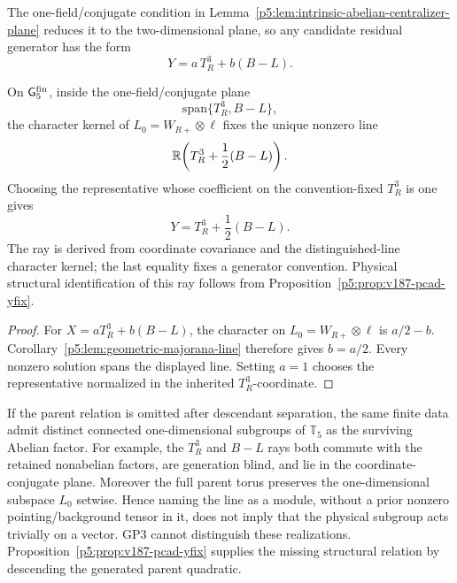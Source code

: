 \documentclass[11pt,a4paper]{article}
\begin{document}
The one-field/conjugate condition in
Lemma~\ref{p5:lem:intrinsic-abelian-centralizer-plane} reduces it to the
two-dimensional plane, so any candidate residual generator has the form
\begin{equation}
\label{p5:eq:part1-Y-general}
Y=a\,T_R^3+b(B-L).
\end{equation}

\begin{lemma}
\label{p5:lem:hypercharge-normalization-unique}
On \(\mathsf G_5^{\rm fin}\), inside the
one-field/conjugate plane
\[
\mathrm{span}\{T_R^3,B-L\},
\]
the character kernel of \(L_0=W_{R+}\otimes\ell\) fixes the unique
nonzero line
\[
\mathbb{R}\!\left(T_R^3+\frac12(B-L)\right).
\]
Choosing the representative whose coefficient on the convention-fixed
\(T_R^3\) is one gives
\[
Y=T_R^3+\frac12(B-L).
\]
The ray is derived from coordinate covariance and the distinguished-line
character kernel; the last equality fixes a generator convention.  Physical structural identification of this ray follows from
Proposition~\ref{p5:prop:v187-pcad-yfix}.
\end{lemma}

\begin{proof}
For \(X=aT_R^3+b(B-L)\), the character on
\(L_0=W_{R+}\otimes\ell\) is \(a/2-b\).
Corollary~\ref{p5:lem:geometric-majorana-line} therefore gives
\(b=a/2\).  Every nonzero solution spans the displayed line.  Setting
\(a=1\) chooses the representative normalized in the inherited
\(T_R^3\)-coordinate.
\end{proof}

\begin{remark}
\label{p5:rem:yfix-no-go}
If the parent relation is omitted after descendant separation, the same finite data admit distinct connected
one-dimensional subgroups of \(\mathbb T_5\) as the surviving Abelian factor.
For example, the \(T_R^3\) and \(B-L\) rays both commute with the retained
nonabelian factors, are generation blind, and lie in the
coordinate-conjugate plane.  Moreover the full parent torus preserves the
one-dimensional subspace \(L_0\) setwise.  Hence naming the line as a module,
without a prior nonzero pointing/background tensor in it, does not imply that
the physical subgroup acts trivially on a vector.  GP3 cannot distinguish
these realizations.  Proposition~\ref{p5:prop:v187-pcad-yfix} supplies the
missing structural relation by descending the generated parent quadratic.
\end{remark}
\end{document}

